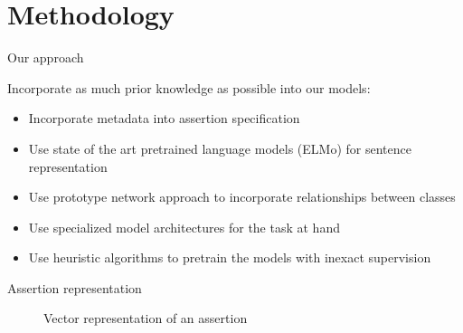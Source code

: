 \documentclass[pdf]{beamer}
\newcommand{\?}{\ensuremath{^\texttt{\bf [CITATION~NEEDED]}}}
\begin{document}
\section{Methodology}

\begin{frame}{Our approach}

Incorporate as much prior knowledge as possible into our models:

\begin{itemize}
\item Incorporate metadata into assertion specification
\item Use state of the art pretrained language models (ELMo) for sentence representation
\item Use prototype network approach to incorporate relationships between classes
\item Use specialized model architectures for the task at hand
\item Use heuristic algorithms to pretrain the models with inexact supervision
\end{itemize}

\end{frame}

\begin{frame}{Assertion representation}

\begin{figure}
\centering
{}
\caption{Vector representation of an assertion}
\label{fig_assertion}
\end{figure}

\end{frame}
\end{document}
